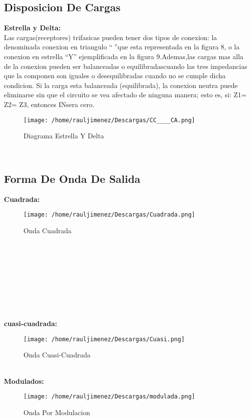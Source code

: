 \documentclass[11pt]{article}
\begin{document}
\subsection{Disposicion De Cargas}
\textbf{Estrella y Delta:}\\
Las cargas(receptores) trifasicas pueden tener dos tipos de conexion: la denominada conexion en triangulo “”que esta representada en la figura 8, o la conexion en estrella “Y” ejemplificada en la figura 9.Ademas,las cargas mas alla de la conexion pueden ser balanceadas o equilibradascuando las tres  impedancias  que  la  componen  son  iguales  o desequilibradas cuando  no  se  cumple  dicha condicion.
Si la carga esta balanceada (equilibrada), la conexion neutra puede eliminarse sin que el circuito se vea afectado de ninguna manera; esto es, si: Z1= Z2= Z3, entonces INsera cero.\\
\begin{figure}[htp]
\centering
\texttt{[image: /home/rauljimenez/Descargas/CC\_\_\_\_CA.png]}
\caption{Diagrama Estrella Y Delta}
\label{}
\end{figure}\\
\subsection{Forma De Onda De Salida}
\textbf{Cuadrada:}\\
\begin{figure}[htp]
\centering
\texttt{[image: /home/rauljimenez/Descargas/Cuadrada.png]}
\caption{Onda Cuadrada}
\label{}
\end{figure}\\\\\\\\\\\\\\\\
\textbf{cuasi-cuadrada:}\\
\begin{figure}[htp]
\centering
\texttt{[image: /home/rauljimenez/Descargas/Cuasi.png]}
\caption{Onda Cuasi-Cuadrada}
\label{}
\end{figure}\\
\textbf{Modulados:}\\
\begin{figure}[htp]
\centering
\texttt{[image: /home/rauljimenez/Descargas/modulada.png]}
\caption{Onda Por Modulacion}
\label{}
\end{figure}\\\\\\\\\\
\end{document}
